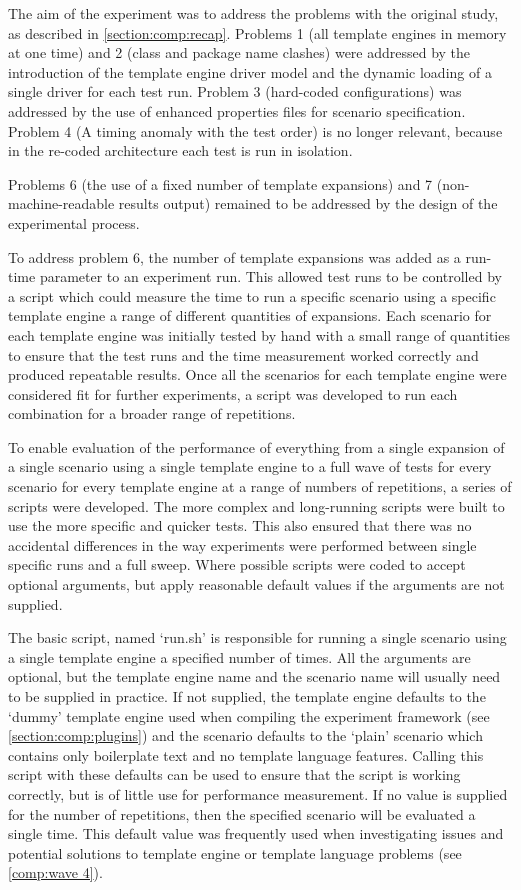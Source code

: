 The aim of the experiment was to address the problems with the original study, as described in \autoref{section:comp:recap}. Problems 1 (all template engines in memory at one time) and 2 (class and package name clashes) were addressed by the introduction of the template engine driver model and the dynamic loading of a single driver for each test run. Problem 3 (hard-coded configurations) was addressed by the use of enhanced properties files for scenario specification. Problem 4 (A timing anomaly with the test order) is no longer relevant, because in the re-coded architecture each test is run in isolation.

Problems 6 (the use of a fixed number of template expansions) and 7 (non-machine-readable results output) remained to be addressed by the design of the experimental process.

To address problem 6, the number of template expansions was added as a run-time parameter to an experiment run. This allowed test runs to be controlled by a script which could measure the time to run a specific scenario using a specific template engine a range of different quantities of expansions. Each scenario for each template engine was initially tested by hand with a small range of quantities to ensure that the test runs and the time measurement worked correctly and produced repeatable results. Once all the scenarios for each template engine were considered fit for further experiments, a script was developed to run each combination for a broader range of repetitions.

To enable evaluation of the performance of everything from a single expansion of a single scenario using a single template engine to a full wave of tests for every scenario for every template engine at a range of numbers of repetitions, a series of scripts were developed. The more complex and long-running scripts were built to use the more specific and quicker tests. This also ensured that there was no accidental differences in the way experiments were performed between single specific runs and a full sweep. Where possible scripts were coded to accept optional arguments, but apply reasonable default values if the arguments are not supplied.

The basic script, named `run.sh' is responsible for running a single scenario using a single template engine a specified number of times. All the arguments are optional, but the template engine name and the scenario name will usually need to be supplied in practice. If not supplied, the template engine defaults to the `dummy' template engine used when compiling the experiment framework (see \autoref{section:comp:plugins}) and the scenario defaults to the `plain' scenario which contains only boilerplate text and no template language features. Calling this script with these defaults can be used to ensure that the script is working correctly, but is of little use for performance measurement. If no value is supplied for the number of repetitions, then the specified scenario will be evaluated a single time. This default value was frequently used when investigating issues and potential solutions to template engine or template language problems (see \autoref{comp:wave 4}).

